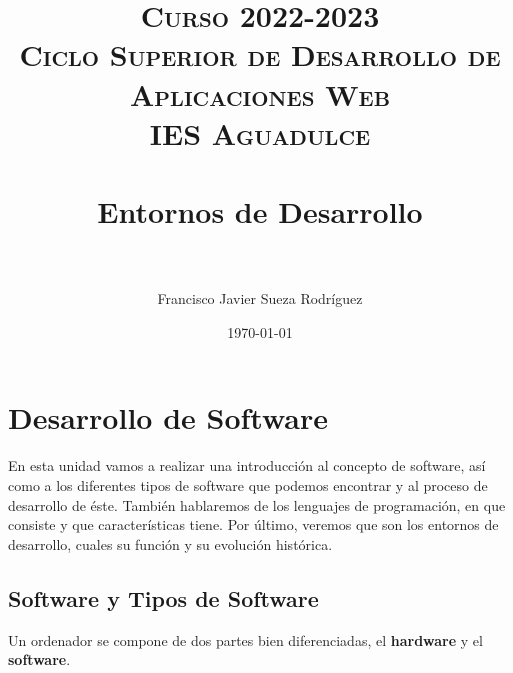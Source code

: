 


\title{
\normalfont \normalsize
\textsc{{\bfseries Curso 2022-2023} \\ Ciclo Superior de Desarrollo de Aplicaciones Web \\ IES Aguadulce} \\ [25pt]
\horrule{0.5pt} \\[0.4cm]
\huge Entornos de Desarrollo \\
\horrule{0.5pt} \\[0.4cm]
}

\author{Francisco Javier Sueza Rodríguez}
\date{\normalsize\today}


\makeglossaries
{}



\maketitle

\newpage

\tableofcontents

\listoffigures


\newpage

\chapter{Desarrollo de Software}
En esta unidad vamos a realizar una introducción al concepto de software, así como a los diferentes tipos de software que podemos encontrar y al proceso de desarrollo de éste. También hablaremos de los lenguajes de programación, en que consiste y que características tiene. Por último, veremos que son los entornos de desarrollo, cuales su función y su evolución histórica.

\section{Software y Tipos de Software}
Un ordenador se compone de dos partes bien diferenciadas, el {\bfseries hardware} y el {\bfseries software}.

